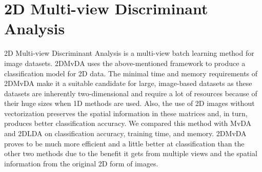 






\section{2D Multi-view Discriminant Analysis}
\label{sec:Conc_2DMvDA}
2D Multi-view Discriminant Analysis is a multi-view batch learning method for image datasets. 2DMvDA uses the above-mentioned framework to produce a classification model for 2D data. The minimal time and memory requirements of 2DMvDA make it a suitable candidate for large, image-based datasets as these datasets are inherently two-dimensional and require a lot of resources because of their huge sizes when 1D methods are used. Also, the use of 2D images without vectorization preserves the spatial information in these matrices and, in turn, produces better classification accuracy. We compared this method with MvDA and 2DLDA on classification accuracy, training time, and memory. 2DMvDA proves to be much more efficient and a little better at classification than the other two methods due to the benefit it gets from multiple views and the spatial information from the original 2D form of images.








